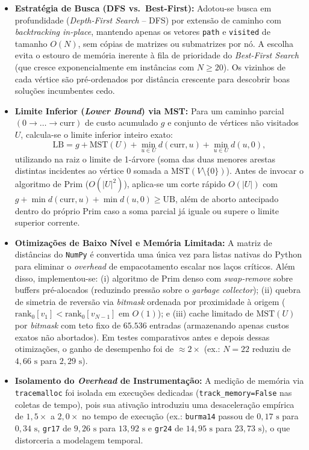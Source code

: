 \begin{itemize}
    \item \textbf{Estratégia de Busca (DFS vs.\ Best-First):} Adotou-se busca em profundidade (\textit{Depth-First Search} -- DFS) por extensão de caminho com \textit{backtracking in-place}, mantendo apenas os vetores \texttt{path} e \texttt{visited} de tamanho $O(N)$, sem cópias de matrizes ou submatrizes por nó. A escolha evita o estouro de memória inerente à fila de prioridade do \textit{Best-First Search} (que cresce exponencialmente em instâncias com $N \ge 20$). Os vizinhos de cada vértice são pré-ordenados por distância crescente para descobrir boas soluções incumbentes cedo.
    \item \textbf{Limite Inferior (\textit{Lower Bound}) via MST:} Para um caminho parcial $(0 \to \dots \to \text{curr})$ de custo acumulado $g$ e conjunto de vértices não visitados $U$, calcula-se o limite inferior inteiro exato:
    \[
        \mathrm{LB} = g + \mathrm{MST}(U) + \min_{u \in U} d(\text{curr}, u) + \min_{u \in U} d(u, 0),
    \]
    utilizando na raiz o limite de 1-árvore (soma das duas menores arestas distintas incidentes ao vértice $0$ somada a $\mathrm{MST}(V \setminus \{0\})$). Antes de invocar o algoritmo de Prim ($O(|U|^2)$), aplica-se um corte rápido $O(|U|)$ com $g + \min d(\text{curr}, u) + \min d(u, 0) \ge \mathrm{UB}$, além de aborto antecipado dentro do próprio Prim caso a soma parcial já iguale ou supere o limite superior corrente.
    \item \textbf{Otimizações de Baixo Nível e Memória Limitada:} A matriz de distâncias do \texttt{NumPy} é convertida uma única vez para listas nativas do Python para eliminar o \textit{overhead} de empacotamento escalar nos laços críticos. Além disso, implementou-se: (i) algoritmo de Prim denso com \textit{swap-remove} sobre buffers pré-alocados (reduzindo pressão sobre o \textit{garbage collector}); (ii) quebra de simetria de reversão via \textit{bitmask} ordenada por proximidade à origem ($\text{rank}_0[v_1] < \text{rank}_0[v_{N-1}]$ em $O(1)$); e (iii) cache limitado de $\mathrm{MST}(U)$ por \textit{bitmask} com teto fixo de $65.536$ entradas (armazenando apenas custos exatos não abortados). Em testes comparativos antes e depois dessas otimizações, o ganho de desempenho foi de $\approx 2\times$ (ex.: $N=22$ reduziu de $4{,}66\text{ s}$ para $2{,}29\text{ s}$).
    \item \textbf{Isolamento do \textit{Overhead} de Instrumentação:} A medição de memória via \texttt{tracemalloc} foi isolada em execuções dedicadas (\texttt{track\_memory=False} nas coletas de tempo), pois sua ativação introduziu uma desaceleração empírica de $1{,}5\times$ a $2{,}0\times$ no tempo de execução (ex.: \texttt{burma14} passou de $0{,}17\text{ s}$ para $0{,}34\text{ s}$, \texttt{gr17} de $9{,}26\text{ s}$ para $13{,}92\text{ s}$ e \texttt{gr24} de $14{,}95\text{ s}$ para $23{,}73\text{ s}$), o que distorceria a modelagem temporal.
\end{itemize}

